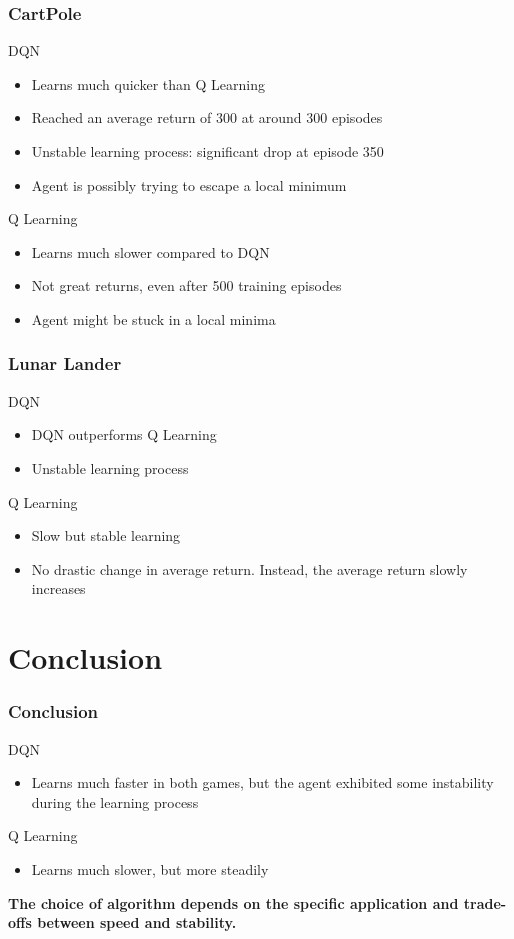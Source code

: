 \documentclass{beamer}
\begin{document}
\begin{frame}
    \frametitle{CartPole}
    DQN\pause
    \begin{itemize}
        \item Learns much quicker than Q Learning \pause
        \item Reached an average return of 300 at around 300 episodes \pause
        \item Unstable learning process: significant drop at episode 350 \pause
        \item Agent is possibly trying to escape a local minimum \pause
    \end{itemize}
    Q Learning\pause
    \begin{itemize}
        \item Learns much slower compared to DQN \pause
        \item Not great returns, even after 500 training episodes \pause
        \item Agent might be stuck in a local minima
    \end{itemize}

\end{frame}

\begin{frame}
    \frametitle{Lunar Lander}

    DQN \pause
    \begin{itemize}
        \item DQN outperforms Q Learning \pause
        \item Unstable learning process \pause
    \end{itemize}
    Q Learning \pause
    \begin{itemize}
        \item Slow but stable learning \pause
        \item No drastic change in average return. Instead, the average return slowly
              increases
    \end{itemize}

\end{frame}

\section{Conclusion}

\begin{frame}
    \frametitle{Conclusion}

    DQN \pause
    \begin{itemize}
        \item Learns much faster in both games, but the agent exhibited some instability
              during the learning process \pause
    \end{itemize}
    Q Learning \pause
    \begin{itemize}
        \item Learns much slower, but more steadily \pause
    \end{itemize}
    \medskip
    \textbf{The choice of algorithm depends on the specific application and trade-offs between speed and stability.}

\end{frame}
\end{document}
